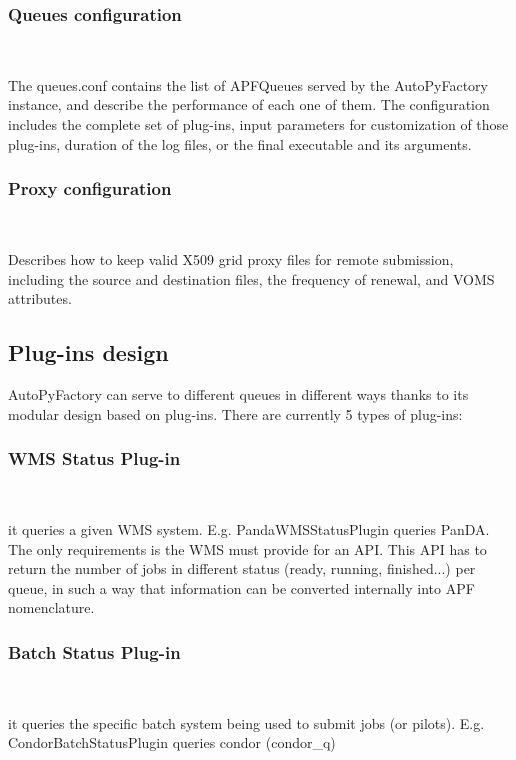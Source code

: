 \documentclass[a4paper]{jpconf}
\begin{document}
\subsubsection{Queues configuration}

~

\noindent The queues.conf contains the list of APFQueues served by the AutoPyFactory instance,
and describe the performance of each one of them. 
The configuration includes the complete set of plug-ins, 
input parameters for customization of those plug-ins, 
duration of the log files, 
or the final executable and its arguments.

\subsubsection{Proxy configuration}

~

\noindent Describes how to keep valid X509 grid proxy files for remote submission,
including the source and destination files, 
the frequency of renewal, 
and VOMS attributes.

\subsection{Plug-ins design}

AutoPyFactory can serve to different queues in different ways 
thanks to its modular design based on plug-ins. 
There are currently 5 types of plug-ins:

\subsubsection{WMS Status Plug-in}

~

\noindent it queries a given WMS system. E.g. PandaWMSStatusPlugin queries PanDA. 
The only requirements is the WMS must provide for an API. 
This API has to return the number of jobs in different status (ready, running, finished...) per queue, 
in such a way that information can be converted internally into APF nomenclature. 

\subsubsection{Batch Status Plug-in}

~

\noindent it queries the specific batch system being used to submit jobs (or pilots). 
E.g. CondorBatchStatusPlugin queries condor (condor\_q)
\end{document}
